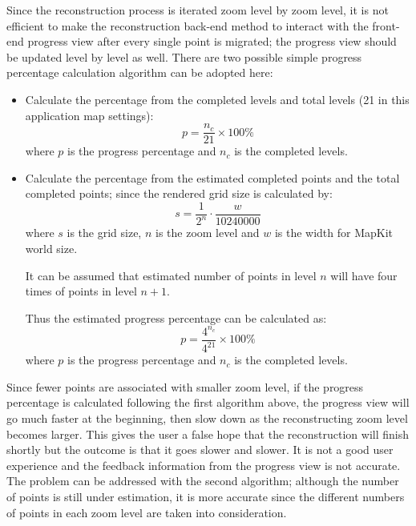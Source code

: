 \documentclass[12pt,a4paper]{article}
\begin{document}
            Since the reconstruction process is iterated zoom level by zoom level, it is not efficient to make the reconstruction back-end method to interact with the front-end progress view after every single point is migrated; the progress view should be updated level by level as well. There are two possible simple progress percentage calculation algorithm can be adopted here:
            \begin{itemize}
                \setlength\itemsep{-0.5em}
                \item Calculate the percentage from the completed levels and total levels (21 in this application map settings):
                \begin{equation}
                    p = \frac{n_c}{21}\times100\%
                \end{equation}
                where $p$ is the progress percentage and $n_c$ is the completed levels.
                \item Calculate the percentage from the estimated completed points and the total completed points; since the rendered grid size is calculated by:
                \begin{equation}
                    s = \frac{1}{2^{n}}\cdot\frac{w}{10240000}
                \end{equation}
                where $s$ is the grid size, $n$ is the zoom level and $w$ is the width for MapKit world size.
                
                It can be assumed that estimated number of points in level $n$ will have four times of points in level $n+1$.
                
                Thus the estimated progress percentage can be calculated as:
                \begin{equation}
                    p = \frac{4^{n_c}}{4^{21}}\times100\%
                \end{equation}
                where $p$ is the progress percentage and $n_c$ is the completed levels.
            \end{itemize}
            
            Since fewer points are associated with smaller zoom level, if the progress percentage is calculated following the first algorithm above, the progress view will go much faster at the beginning, then slow down as the reconstructing zoom level becomes larger. This gives the user a false hope that the reconstruction will finish shortly but the outcome is that it goes slower and slower. It is not a good user experience and the feedback information from the progress view is not accurate. The problem can be addressed with the second algorithm; although the number of points is still under estimation, it is more accurate since the different numbers of points in each zoom level are taken into consideration.
            
\end{document}
